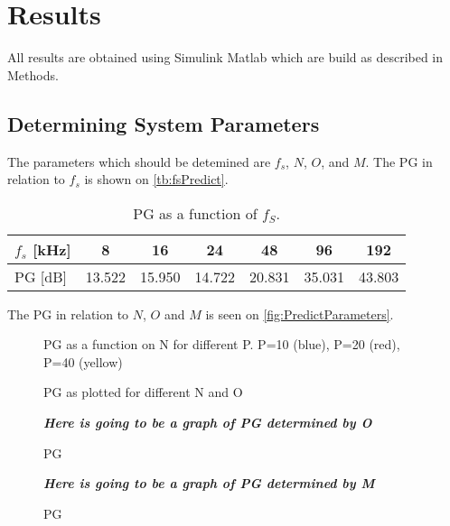 \section{Results}
All results are obtained using Simulink Matlab which are build as described in Methods. 

\subsection{Determining System Parameters}
The parameters which should be detemined are $f_s$, $N$, $O$, and $M$.         
The PG in relation to $f_s$ is shown on \autoref{tb:fsPredict}.

\begin{table}[H]
\centering
\begin{tabular}{|l|c|c|c|c|c|c|}
\hline
$f_s$ {[}kHz{]} & 8 & 16 & 24 & 48 & 96 & 192 \\ \hline
PG {[}dB{]} & 13.522 & 15.950 & 14.722 & 20.831 & 35.031 & 43.803 \\ \hline
\end{tabular}
\caption{PG as a function of $f_S$.}
\label{tb:fsPredict}
\end{table}


% 	


The PG in relation to $N$, $O$ and $M$ is seen on \autoref{fig:PredictParameters}. 
\begin{figure}[H]
	\centering
	
	\caption{PG as a function on N for different P. P=10 (blue), P=20 (red), P=40 (yellow)}
	\label{fig:PredictN}
\end{figure}

\begin{figure}[H]
	\centering
	
	\caption{PG as plotted for different N and O}
	\label{fig:PredictN}
\end{figure}


\begin{figure}[H]
	\centering
	\textbf{\textit{Here is going to be a graph of PG determined by O}}
	\caption{PG }
	\label{fig:PredictO}
\end{figure}
\begin{figure}[H]
	\centering
	\textbf{\textit{Here is going to be a graph of PG determined by M}}
	\caption{PG }
	\label{fig:PredictM}
\end{figure}

